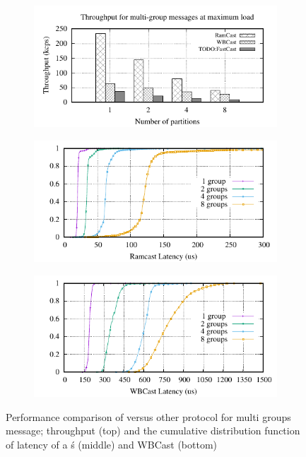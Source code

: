 \begin{figure}[htp!]
  \begin{subfigure}{\columnwidth}
    \centering
    \includegraphics[width=0.99\columnwidth]{figures/benchmark/graphs/figure-multi-dest-compare-throughput}
  \label{fig:tpcc_repartitioning}
  \end{subfigure}
  \begin{subfigure}{\columnwidth}
    \centering
    \includegraphics[width=0.95\columnwidth]{figures/benchmark/graphs/figure-multi-dest-compare-latency-cdf-ramcast}
  \end{subfigure}
  \begin{subfigure}{\columnwidth}
    \centering
    \includegraphics[width=0.95\columnwidth]{figures/benchmark/graphs/figure-multi-dest-compare-latency-cdf-wbcast}
  \end{subfigure}
  \caption{Performance comparison of \libname versus other protocol for multi groups message; throughput (top) and the cumulative distribution function of latency of a \libname\'s (middle) and WBCast (bottom)}
\end{figure}
